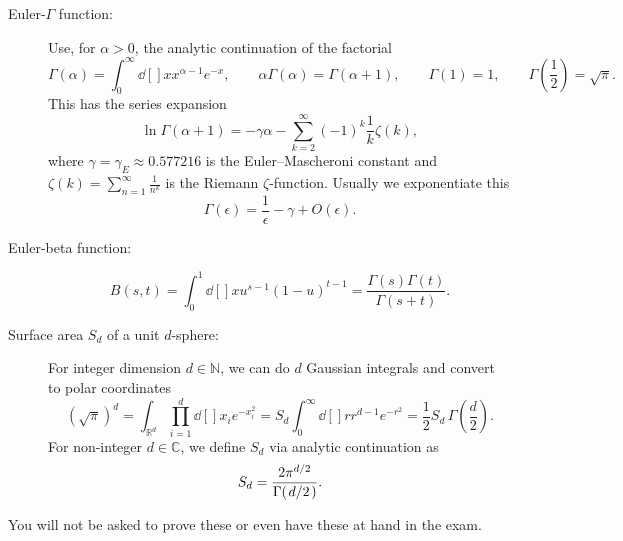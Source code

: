 \begin{appendices}
\begin{description}
  \item[Euler-$\Gamma$ function:]
    Use, for $\alpha > 0$, the analytic continuation of the factorial
    \begin{equation}
      \Gamma(\alpha) = \int_0^\infty \dd[]{x} x^{\alpha -1} e^{-x}, \qquad 
      \alpha \Gamma(\alpha) = \Gamma(\alpha + 1), \qquad 
      \Gamma(1) = 1, \qquad 
      \Gamma\left(\frac{1}{2}\right) = \sqrt{\pi}.
    \end{equation}
    This has the series expansion
    \begin{equation}
      \ln \Gamma(\alpha + 1) = -\gamma \alpha - \sum_{k=2}^{\infty} (-1)^k \frac{1}{k} \zeta(k),
    \end{equation}
    where $\gamma = \gamma_E \approx 0.577216$  is the Euler--Mascheroni constant and $\zeta(k) = \sum_{n=1}^{\infty} \frac{1}{n^k}$ is the Riemann $\zeta$-function.
    Usually we exponentiate this
    \begin{equation}
      \Gamma(\epsilon) = \frac{1}{\epsilon} - \gamma + O(\epsilon).
    \end{equation}

  \item[Euler-beta function:]
    \begin{equation}
      B(s, t) = \int_{0}^{1}\dd[]{x} u^{s-1} (1-u)^{t-1} = \frac{\Gamma(s) \Gamma(t)}{\Gamma(s + t)}.
    \end{equation}

  \item[Surface area $S_d$ of a unit $d$-sphere:]
    For integer dimension $d \in \mathbb{N}$, we can do $d$ Gaussian integrals and convert to polar coordinates
    \begin{equation}
      (\sqrt{\pi})^d = \int_{\mathbb{R}^d} \prod_{i=1}^d \dd[]{x_i} e^{-x_i^2} = S_d \int_0^{\infty} \dd[]{r} r^{d-1} e^{-r^2} = \frac{1}{2} S_d \, \Gamma(\frac{d}{2}).
    \end{equation}
    For non-integer $d \in \mathbb{C}$, we define $S_d$ via analytic continuation as
    \begin{equation}
      \label{eq:apx-sd}
      S_d = \frac{2 \pi^{d / 2}}{\Gamma(\flatfrac{d}{2})}.
    \end{equation}
\end{description}
\begin{remark}
  You will not be asked to prove these or even have these at hand in the exam.
\end{remark}



\end{appendices}
